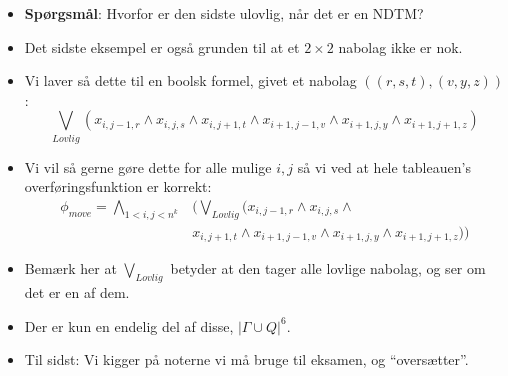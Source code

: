 \begin{frame}[allowframebreaks]
\begin{itemize}
  \item \textbf{Spørgsmål}: Hvorfor er den sidste ulovlig, når det er en NDTM?
  \item Det sidste eksempel er også grunden til at et $2 \times 2$ nabolag ikke er nok.
  \item Vi laver så dette til en boolsk formel, givet et nabolag $((r,s,t),(v,y,z))$:
		\begin{equation}
\bigvee_{Lovlig}  (x_{i,j-1,r} \wedge x_{i,j,s} \wedge x_{i,j+1,t} \wedge x_{i+1,j-1,v} \wedge x_{i+1,j,y} \wedge x_{i+1,j+1,z})
		\end{equation}
  \item Vi vil så gerne gøre dette for alle mulige $i,j$ så vi ved at hele tableauen's overføringsfunktion er korrekt:
		\begin{align*}
		  \phi_{move} = \bigwedge_{1 < i,j < n^{k}}& \Big( \bigvee_{Lovlig} (x_{i,j-1,r} \wedge x_{i,j,s} \wedge  \\
		  &x_{i,j+1,t} \wedge x_{i+1, j-1, v} \wedge x_{i+1,j,y} \wedge x_{i+1,j+1,z}) \Big)
		\end{align*}
  \item Bemærk her at $\bigvee_{Lovlig}$ betyder at den tager alle lovlige nabolag, og ser om det er en af dem.
  \item Der er kun en endelig del af disse, $|\Gamma \cup Q|^{6}$.
  \item Til sidst: Vi kigger på noterne vi må bruge til eksamen, og ``oversætter''.
\end{itemize}
\end{frame}

